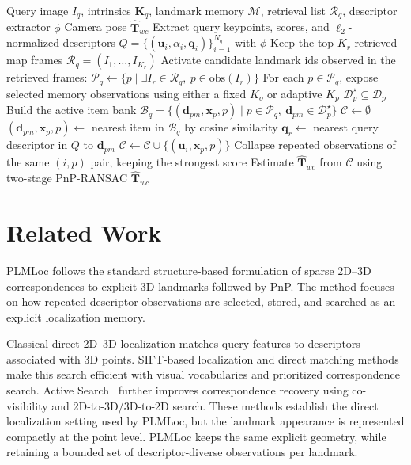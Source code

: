 \documentclass[letterpaper,10 pt,conference]{ieeeconf}
\newcommand{\method}{PLMLoc}
\begin{document}
\begin{algorithm}[t]
\caption{\method{} Query-Time Localization}
\label{alg:plmloc-query}
\small
\begin{algorithmic}[1]
\Require Query image $I_q$, intrinsics $\mathbf{K}_q$, landmark memory $\mathcal{M}$, retrieval list $\mathcal{R}_q$, descriptor extractor $\phi$
\Ensure Camera pose $\hat{\mathbf{T}}_{wc}$
\State Extract query keypoints, scores, and $\ell_2$-normalized descriptors
       $Q=\{(\mathbf{u}_i,\alpha_i,\mathbf{q}_i)\}_{i=1}^{N_q}$ with $\phi$
\State Keep the top $K_r$ retrieved map frames
       $\mathcal{R}_q=(I_1,\ldots,I_{K_r})$
\State Activate candidate landmark ids observed in the retrieved frames:
       $\mathcal{P}_q \leftarrow \{p \mid \exists I_r\in\mathcal{R}_q,\ p\in\mathrm{obs}(I_r)\}$
\State For each $p\in\mathcal{P}_q$, expose selected memory observations using either a fixed $K_o$ or adaptive $K_p$
       $\mathcal{D}^{\star}_p\subseteq\mathcal{D}_p$
\State Build the active item bank
       $\mathcal{B}_q=\{(\mathbf{d}_{pm},\mathbf{x}_p,p)\mid p\in\mathcal{P}_q,\ \mathbf{d}_{pm}\in\mathcal{D}^{\star}_p\}$
\State $\mathcal{C}\leftarrow\emptyset$
    \State $(\mathbf{d}_{pm},\mathbf{x}_p,p) \leftarrow$ nearest item in $\mathcal{B}_q$ by cosine similarity
    \State $\mathbf{q}_{r} \leftarrow$ nearest query descriptor in $Q$ to $\mathbf{d}_{pm}$
     
        \State $\mathcal{C}\leftarrow\mathcal{C}\cup\{(\mathbf{u}_i,\mathbf{x}_p,p)\}$
    \EndIf
\EndFor
\State Collapse repeated observations of the same $(i,p)$ pair, keeping the strongest score
\State Estimate $\hat{\mathbf{T}}_{wc}$ from $\mathcal{C}$ using two-stage PnP-RANSAC
\State \Return $\hat{\mathbf{T}}_{wc}$
\end{algorithmic}
\end{algorithm}

\section{Related Work}

\method{} follows the standard structure-based formulation of sparse 2D--3D correspondences to explicit 3D landmarks followed by PnP. The method focuses on how repeated descriptor observations are selected, stored, and searched as an explicit localization memory.

Classical direct 2D--3D localization matches query features to descriptors associated with 3D points. SIFT-based localization and direct matching methods~\cite{lowe2004sift,sattler2011fast} make this search efficient with visual vocabularies and prioritized correspondence search. Active Search~\cite{sattler2012active} further improves correspondence recovery using co-visibility and 2D-to-3D/3D-to-2D search. These methods establish the direct localization setting used by \method{}, but the landmark appearance is represented compactly at the point level. \method{} keeps the same explicit geometry, while retaining a bounded set of descriptor-diverse observations per landmark.
\end{document}
